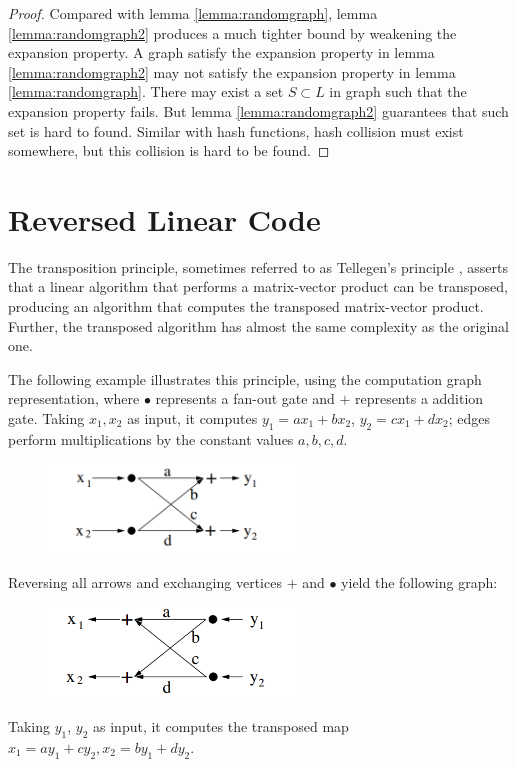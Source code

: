 \begin{proof}
Compared with lemma \ref{lemma:randomgraph}, lemma \ref{lemma:randomgraph2} produces a much tighter bound by weakening the expansion property. A graph satisfy the expansion property in lemma \ref{lemma:randomgraph2} may not satisfy the expansion property in lemma \ref{lemma:randomgraph}. There may exist a set $S \subset L$ in graph such that the expansion property fails. But lemma \ref{lemma:randomgraph2} guarantees that such set is hard to found. Similar with hash functions, hash collision must exist somewhere, but this collision is hard to be found.

\end{proof}

\section{Reversed Linear Code}

The transposition principle, sometimes referred to as Tellegen’s principle \cite{Tellegen}, asserts that a linear algorithm that performs a matrix-vector product can be transposed, producing an algorithm that computes the transposed matrix-vector product. Further, the transposed algorithm has almost the same complexity as the original one.

The following example illustrates this principle, using the
computation graph representation, where $\bullet$ represents a fan-out gate and $+$ represents a addition gate. Taking $x_1, x_2$ as input, it computes $y_1 = ax_1 + bx_2$, $y_2 = cx_1 + dx_2$; edges perform multiplications by the constant values $a, b, c, d$.

\begin{figure}[h]
    \centering
    \includegraphics[width=0.6\textwidth]{graph/t1.png}
\end{figure}

Reversing all arrows and exchanging vertices $+$ and $\bullet$ yield the following graph:

\begin{figure}[h]
    \centering
    \includegraphics[width=0.6\textwidth]{graph/t2.png}
\end{figure}
Taking $y_1$, $y_2$ as input, it computes the transposed map $x_1 = ay_1 + cy_2, x_2 = by_1 + dy_2$.

